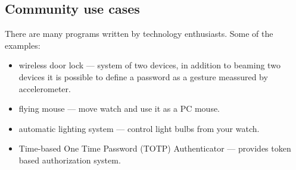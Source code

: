\subsection{Community use cases}
There are many programs written by technology enthusiasts. Some of the
examples:

\begin{itemize}
  \item wireless door lock --- system of two devices, in addition to beaming two devices it is possible to define a password as a gesture meassured by accelerometer.
  \item flying mouse --- move watch and use it as a PC mouse.
  \item automatic lighting system --- control light bulbs from your watch.
  \item Time-based One Time Password (TOTP) Authenticator --- provides token based authorization system.
\end{itemize}

